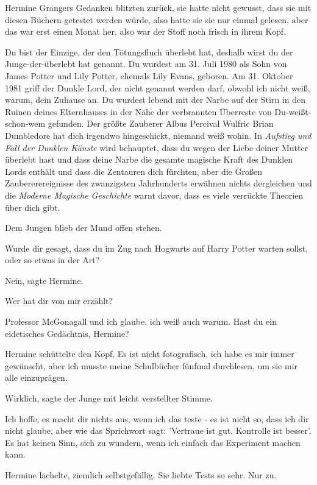 Hermine Grangers Gedanken blitzten zurück, sie hatte nicht gewusst, dass sie mit
diesen Büchern getestet werden würde, also hatte sie sie nur einmal gelesen,
aber das war erst einen Monat her, also war der Stoff noch frisch in ihrem Kopf.

\glqq Du bist der Einzige, der den Tötungsfluch überlebt hat, deshalb wirst du
der Junge-der-überlebt hat genannt. Du wurdest am 31. Juli 1980 als Sohn von
James Potter und Lily Potter, ehemals Lily Evans, geboren. Am 31. Oktober 1981
griff der Dunkle Lord, der nicht genannt werden darf, obwohl ich nicht weiß,
warum, dein Zuhause an. Du wurdest lebend mit der Narbe auf der Stirn in den
Ruinen deines Elternhauses in der Nähe der verbrannten Überreste von
Du-weißt-schon-wem gefunden. Der größte Zauberer Albus Percival Wulfric Brian
Dumbledore hat dich irgendwo hingeschickt, niemand weiß wohin. In \emph{Aufstieg
und Fall der Dunklen Künste} wird behauptet, dass du wegen der Liebe deiner
Mutter überlebt hast und dass deine Narbe die gesamte magische Kraft des Dunklen
Lords enthält und dass die Zentauren dich fürchten, aber die Großen
Zaubererereignisse des zwanzigsten Jahrhunderts erwähnen nichts dergleichen und
die \emph{Moderne Magische Geschichte} warnt davor, dass es viele verrückte
Theorien über dich gibt.\grqq{}

Dem Jungen blieb der Mund offen stehen.

\glqq Wurde dir gesagt, dass du im Zug nach Hogwarts auf Harry Potter warten
sollst, oder so etwas in der Art?\grqq{}

\glqq Nein\grqq{}, sagte Hermine.

\glqq Wer hat dir von mir erzählt?\grqq{}

\glqq Professor McGonagall und ich glaube, ich weiß auch warum. Hast du ein
eidetisches Gedächtnis, Hermine?\grqq{}

Hermine schüttelte den Kopf. \glqq Es ist nicht fotografisch, ich habe es mir
immer gewünscht, aber ich musste meine Schulbücher fünfmal durchlesen, um sie
mir alle einzuprägen.\grqq{}

\glqq Wirklich\grqq{}, sagte der Junge mit leicht verstellter Stimme.

\glqq Ich hoffe, es macht dir nichts aus, wenn ich das teste - es ist nicht so,
dass ich dir nicht glaube, aber wie das Sprichwort sagt: 'Vertraue ist gut,
Kontrolle ist besser'. Es hat keinen Sinn, sich zu wundern, wenn ich einfach das
Experiment machen kann.\grqq{}

Hermine lächelte, ziemlich selbstgefällig. Sie liebte Tests so sehr. \glqq Nur
zu.\grqq{}

